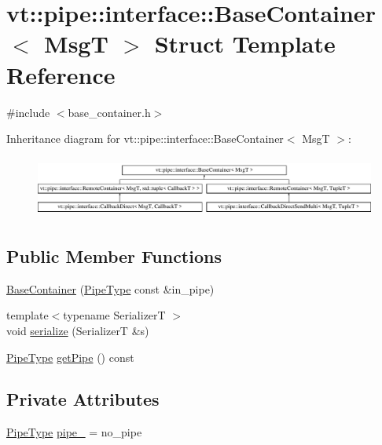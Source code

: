 \hypertarget{structvt_1_1pipe_1_1interface_1_1_base_container}{}\section{vt\+:\+:pipe\+:\+:interface\+:\+:Base\+Container$<$ MsgT $>$ Struct Template Reference}
\label{structvt_1_1pipe_1_1interface_1_1_base_container}


{\ttfamily \#include $<$base\+\_\+container.\+h$>$}

Inheritance diagram for vt\+:\+:pipe\+:\+:interface\+:\+:Base\+Container$<$ MsgT $>$\+:\begin{figure}[H]
\begin{center}
\leavevmode
\includegraphics[height=2.043796cm]{structvt_1_1pipe_1_1interface_1_1_base_container}
\end{center}
\end{figure}
\subsection*{Public Member Functions}
\begin{DoxyCompactItemize}
\item 
\hyperlink{structvt_1_1pipe_1_1interface_1_1_base_container_a096a87229f8c5b3b3bd0cca47cc7f45a}{Base\+Container} (\hyperlink{namespacevt_ac9852acda74d1896f48f406cd72c7bd3}{Pipe\+Type} const \&in\+\_\+pipe)
\item 
{\footnotesize template$<$typename SerializerT $>$ }\\void \hyperlink{structvt_1_1pipe_1_1interface_1_1_base_container_af042ddd27d8c1d683af861e2d12e0940}{serialize} (SerializerT \&s)
\item 
\hyperlink{namespacevt_ac9852acda74d1896f48f406cd72c7bd3}{Pipe\+Type} \hyperlink{structvt_1_1pipe_1_1interface_1_1_base_container_a5301aebfd709a96a3de5e03218c9300f}{get\+Pipe} () const
\end{DoxyCompactItemize}
\subsection*{Private Attributes}
\begin{DoxyCompactItemize}
\item 
\hyperlink{namespacevt_ac9852acda74d1896f48f406cd72c7bd3}{Pipe\+Type} \hyperlink{structvt_1_1pipe_1_1interface_1_1_base_container_a3cada477b55c1201fabef5539825109c}{pipe\+\_\+} = no\+\_\+pipe
\end{DoxyCompactItemize}


